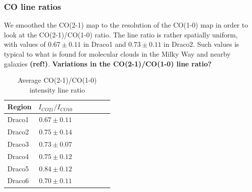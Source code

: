 \documentclass[traditabstract]{aa}
\begin{document}
      \subsubsection{CO line ratios}

   We smoothed the CO(2-1) map to the resolution of the CO(1-0) map in order to look at the CO(2-1)/CO(1-0) ratio. The line ratio is rather spatially uniform, with values of $0.67\pm 0.11$ in Draco1 and $0.73\pm 0.11$ in Draco2. Such values is typical to what is found for molecular clouds in the Milky Way and nearby galaxies \textbf{(ref!)}. \textbf{Variations in the CO(2-1)/CO(1-0) line ratio?}

\begin{table}[h]
  \centering
  \footnotesize
  \caption{Average CO(2-1)/CO(1-0) intensity line ratio}
  \begin{tabular}{lcccccc}
    \hline \hline
    Region & $I_{CO21}/I_{CO10}$ \\ \hline
    Draco1 &   $0.67\pm 0.11$    \\
    Draco2 &   $0.75\pm 0.14$    \\
    Draco3 &   $0.73\pm 0.07$    \\
    Draco4 &   $0.75\pm 0.12$    \\
    Draco5 &   $0.84\pm 0.12$    \\
    Draco6 &   $0.70\pm 0.11$    \\ \hline
  \end{tabular}
\end{table}
\end{document}
